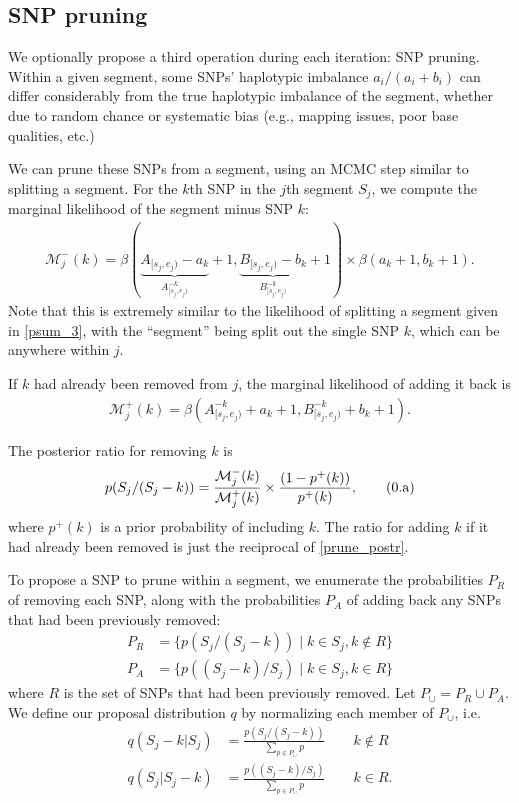 \documentclass[10pt,letter]{article}
\numberwithin{equation}{section}
\newcommand{\rt}{\right}
\newcommand{\lt}{\left}
\newcommand{\btag}[1]{\addtocounter{equation}{1}\label{#1}\tag{\arabic{section}.\alph{equation}}}
\begin{document}
\subsection{SNP pruning}

We optionally propose a third operation during each iteration: SNP pruning. Within a given segment, some SNPs' haplotypic imbalance $a_i/(a_i+b_i)$ can differ considerably from the true haplotypic imbalance of the segment, whether due to random chance or systematic bias (e.g., mapping issues, poor base qualities, etc.)

We can prune these SNPs from a segment, using an MCMC step similar to splitting a segment. For the $k$th SNP in the $j$th segment $S_j$, we compute the marginal likelihood of the segment minus SNP $k$:
\begin{align*}
\mathcal{M}^{-}_j(k) = \beta(\underbrace{A_{[s_j,e_j)} - a_k}_{A^{-k}_{[s_j,e_j)}} + 1, \underbrace{B_{[s_j,e_j)} - b_k}_{B^{-k}_{[s_j,e_j)}} + 1)\times\beta(a_k + 1, b_k + 1).
\end{align*}
Note that this is extremely similar to the likelihood of splitting a segment given in \eqref{psum_3}, with the ``segment'' being split out the single SNP $k$, which can be anywhere within $j$.

If $k$ had already been removed from $j$, the marginal likelihood of adding it back is
\begin{align*}
\mathcal{M}^{+}_j(k) = \beta(A^{-k}_{[s_j,e_j)} + a_k + 1, B^{-k}_{[s_j,e_j)} + b_k + 1).
\end{align*}

The posterior ratio for removing $k$ is
\begin{align*}
p(S_j/(S_j-k))=\frac{\mathcal{M}^{-}_j(k)}{\mathcal{M}^{+}_j(k)}\times\frac{(1 - p^{+}(k))}{p^{+}(k)},\btag{prune_postr}
\end{align*}
where $p^{+}(k)$ is a prior probability of including $k$. %
The ratio for adding $k$ if it had already been removed is just the reciprocal of \eqref{prune_postr}.

To propose a SNP to prune within a segment, we enumerate the probabilities $P_R$ of removing each SNP, along with the probabilities $P_A$ of adding back any SNPs that had been previously removed:
\begin{align*}
P_R &= \{p(S_j/(S_j - k))\mid k\in S_j, k\notin R\}\\
P_A &= \{p((S_j - k)/S_j)\mid k\in S_j, k\in R\}
\end{align*}
where $R$ is the set of SNPs that had been previously removed. Let $P_{\cup}=P_R\cup P_A$. We define our proposal distribution $q$ by normalizing each member of $P_\cup$, i.e.
\begin{align*}
q(S_j-k|S_j) &= \frac{p(S_j/(S_j-k))}{\sum_{p\in P_\cup} p}\qquad k\notin R\\
q(S_j|S_j-k) &= \frac{p((S_j-k)/S_j)}{\sum_{p\in P_\cup} p}\qquad k\in R.
\end{align*}
\end{document}
